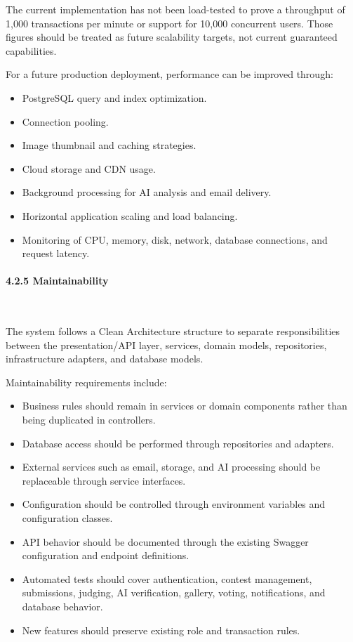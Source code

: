 The current implementation has not been load-tested to prove a throughput of 1,000 transactions per minute or support for 10,000 concurrent users. Those figures should be treated as future scalability targets, not current guaranteed capabilities.

For a future production deployment, performance can be improved through:

\begin{itemize}[leftmargin=1.5em, nosep]
    \item PostgreSQL query and index optimization.
    \item Connection pooling.
    \item Image thumbnail and caching strategies.
    \item Cloud storage and CDN usage.
    \item Background processing for AI analysis and email delivery.
    \item Horizontal application scaling and load balancing.
    \item Monitoring of CPU, memory, disk, network, database connections, and request latency.
\end{itemize}

\paragraph*{4.2.5 Maintainability}\leavevmode\\[-0.5em]
\label{par:maintainability}

The system follows a Clean Architecture structure to separate responsibilities between the presentation/API layer, services, domain models, repositories, infrastructure adapters, and database models.

Maintainability requirements include:

\begin{itemize}[leftmargin=1.5em, nosep]
    \item Business rules should remain in services or domain components rather than being duplicated in controllers.
    \item Database access should be performed through repositories and adapters.
    \item External services such as email, storage, and AI processing should be replaceable through service interfaces.
    \item Configuration should be controlled through environment variables and configuration classes.
    \item API behavior should be documented through the existing Swagger configuration and endpoint definitions.
    \item Automated tests should cover authentication, contest management, submissions, judging, AI verification, gallery, voting, notifications, and database behavior.
    \item New features should preserve existing role and transaction rules.
\end{itemize}

